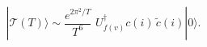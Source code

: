 \begin{equation}\label{eq:leadingTdivergence}
  |\mathcal{T}(T)\rangle \sim \frac{ e^{2 \pi^2 /T}}{ T^6}\,\,
 U_{f(v)}^{\dagger} c(i) \,\tilde{c}(i) |0\rangle.
\end{equation}

